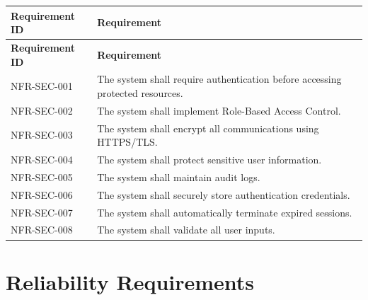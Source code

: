 \begin{longtable}{|p{3cm}|p{10cm}|}

\hline
\textbf{Requirement ID} &
\textbf{Requirement}\\
\hline
\endfirsthead

\hline
\textbf{Requirement ID} &
\textbf{Requirement}\\
\hline
\endhead

NFR-SEC-001 &
The system shall require authentication before accessing protected resources.\\
\hline

NFR-SEC-002 &
The system shall implement Role-Based Access Control.\\
\hline

NFR-SEC-003 &
The system shall encrypt all communications using HTTPS/TLS.\\
\hline

NFR-SEC-004 &
The system shall protect sensitive user information.\\
\hline

NFR-SEC-005 &
The system shall maintain audit logs.\\
\hline

NFR-SEC-006 &
The system shall securely store authentication credentials.\\
\hline

NFR-SEC-007 &
The system shall automatically terminate expired sessions.\\
\hline

NFR-SEC-008 &
The system shall validate all user inputs.\\
\hline

\end{longtable}

\section{Reliability Requirements}
\label{sec:reliability}

